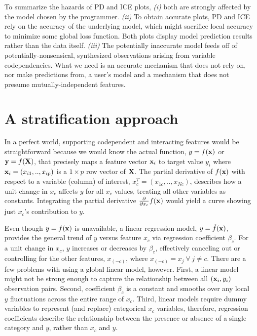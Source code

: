 \documentclass[12pt]{article}
\newcommand{\xnc}{$x_{(-c)}$}
\begin{document}
To summarize the hazards of PD and ICE plots, {\em (i)} both are strongly affected by the model chosen by the programmer.  {\em (ii)} To obtain accurate plots, PD and ICE rely on the accuracy of the underlying model, which might sacrifice local accuracy to minimize some global loss function.  Both plots display model prediction results rather than the data itself. {\em (iii)} The potentially inaccurate model feeds off of potentially-nonsensical, synthesized observations arising from variable codependencies. What we need is an accurate mechanism that does not rely on, nor make predictions from, a user's model and a mechanism that does not presume mutually-independent features.

\section{A stratification approach}

In a perfect world, supporting codependent and interacting features would be straightforward because we would know the actual function, $y = f({\bf x})$ or ${\bf y} = f(\bf X)$, that precisely maps a feature vector ${\bf x}_i$ to target value $y_i$ where ${\bf x}_i = ( x_{i1}, .., x_{ip} )$ is a $1 \times p$ row vector of $\bf X$. The partial derivative of $f({\bf x})$ with respect to a variable (column) of interest, $x_c^T = (x_{1c}, .., x_{Nc})$, describes how a unit change in $x_c$ affects $y$ for all $x_c$ values, treating all other variables as constants. Integrating the partial derivative $\frac{\partial}{\partial x_{c}} f({\bf x})$ would yield a curve showing just $x_{c}$'s contribution to $y$. 

Even though $y = f(\bf x)$ is unavailable, a linear regression model, $y = \hat{f}(\bf x)$, provides the general trend of $y$ versus feature $x_c$ via regression coefficient $\beta_c$. For a unit change in $x_c$, $y$ increases or decreases by $\beta_c$, effectively canceling out or controlling for the other features, \xnc, where $x_{(-c)} = x_{j} ~\forall~ j \neq c$. There are a few problems with using a global linear model, however.  First, a linear model might not be strong enough to capture the relationship between all $({\bf x}_i, y_i)$ observation pairs. Second, coefficient $\beta_c$ is a constant and smooths over any local $y$ fluctuations across the entire range of $x_c$. Third, linear models require dummy variables to represent (and replace) categorical $x_c$ variables, therefore, regression coefficients describe the relationship between the presence or absence of a single category and $y$, rather than $x_c$ and $y$.
\end{document}
